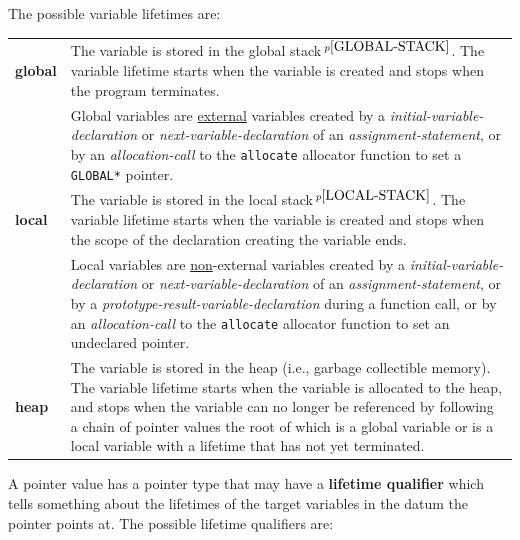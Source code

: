 \documentclass[12pt]{article}
\newcommand{\key}[1]{{\rm \bfseries #1}}
\newcommand{\pagnote}[1]{$\,^{p\pageref{#1}}$}
\newenvironment{indpar}[1][0.3in]%
	{\begin{list}{}%
		     {\setlength{\itemsep}{0in}%
		      \setlength{\topsep}{0in}%
		      \setlength{\parsep}{1ex}%
		      \setlength{\labelwidth}{#1}%
		      \setlength{\leftmargin}{#1}%
		      \addtolength{\leftmargin}{\labelsep}}%
	 \item}%
	{\end{list}}
\begin{document}
The possible variable lifetimes are:
\begin{indpar}[0.2in]
\begin{tabular}{lp{5.0in}}
\key{global} &
	The variable is stored in the global stack\pagnote{GLOBAL-STACK}.
	The variable lifetime starts when the variable is created
	and stops when the program terminates.
	\\[1ex]
	&
	Global variables are \underline{external} variables created by
	a {\em initial-variable-declaration} or {\em next-variable-declaration}
	of an {\em assignment-state\-ment}, or by an {\em allocation-call}
	to the {\tt allocate} allocator function to set a {\tt *GLOBAL*}
	pointer.

\\[1ex]
\key{local} &
	The variable is stored in the local stack\pagnote{LOCAL-STACK}.
	The variable lifetime starts when the variable is created
	and stops when the scope of the declaration creating the
	variable ends.
	\\[1ex]
	&
	Local variables are \underline{non}-external variables created by
	a {\em initial-variable-declaration} or
	{\em next-variable-declaration}
	of an {\em assignment-state\-ment},
	or by a {\em prototype-result-variable-declaration}
	during a function call,
	or by an {\em allocation-call}
	to the {\tt allocate} allocator function to set an undeclared pointer.
\\[1ex]
\key{heap} &
	The variable is stored in the heap (i.e., garbage collectible memory).
	The variable lifetime starts when the variable is allocated
	to the heap, and stops when the variable can no longer
        be referenced by following a chain of pointer values
        the root of which is a global variable or is a local variable
        with a lifetime that has not yet terminated.
\end{tabular}
\end{indpar}

A pointer value has a pointer type that may have a \key{lifetime qualifier}
which tells something about the lifetimes of the target variables in the
datum the pointer points at.  The possible lifetime qualifiers are:
\end{document}
